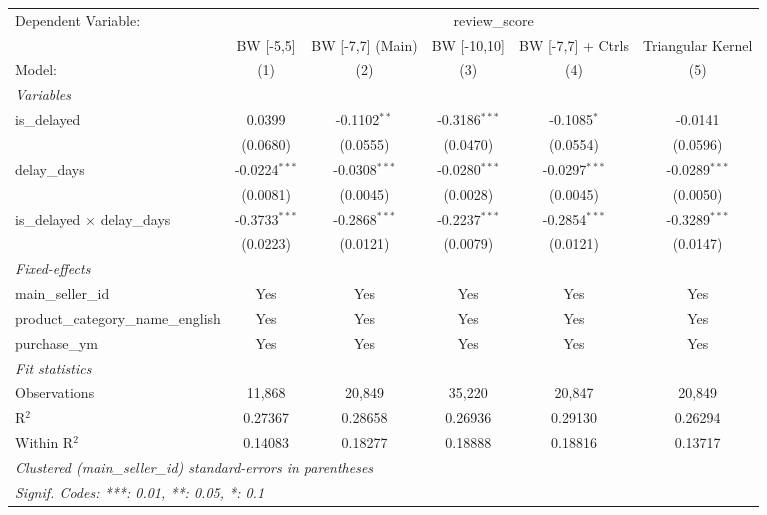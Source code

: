 
\begingroup
\centering
\begin{tabular}{lccccc}
   \tabularnewline \midrule \midrule
   Dependent Variable: & \multicolumn{5}{c}{review\_score}\\
                                       & BW [-5,5]       & BW [-7,7] (Main) & BW [-10,10]     & BW [-7,7] + Ctrls & Triangular Kernel \\   
   Model:                              & (1)             & (2)              & (3)             & (4)               & (5)\\  
   \midrule
   \emph{Variables}\\
   is\_delayed                         & 0.0399          & -0.1102$^{**}$   & -0.3186$^{***}$ & -0.1085$^{*}$     & -0.0141\\   
                                       & (0.0680)        & (0.0555)         & (0.0470)        & (0.0554)          & (0.0596)\\   
   delay\_days                         & -0.0224$^{***}$ & -0.0308$^{***}$  & -0.0280$^{***}$ & -0.0297$^{***}$   & -0.0289$^{***}$\\   
                                       & (0.0081)        & (0.0045)         & (0.0028)        & (0.0045)          & (0.0050)\\   
   is\_delayed $\times$ delay\_days    & -0.3733$^{***}$ & -0.2868$^{***}$  & -0.2237$^{***}$ & -0.2854$^{***}$   & -0.3289$^{***}$\\   
                                       & (0.0223)        & (0.0121)         & (0.0079)        & (0.0121)          & (0.0147)\\   
   \midrule
   \emph{Fixed-effects}\\
   main\_seller\_id                    & Yes             & Yes              & Yes             & Yes               & Yes\\  
   product\_category\_name\_english    & Yes             & Yes              & Yes             & Yes               & Yes\\  
   purchase\_ym                        & Yes             & Yes              & Yes             & Yes               & Yes\\  
   \midrule
   \emph{Fit statistics}\\
   Observations                        & 11,868          & 20,849           & 35,220          & 20,847            & 20,849\\  
   R$^2$                               & 0.27367         & 0.28658          & 0.26936         & 0.29130           & 0.26294\\  
   Within R$^2$                        & 0.14083         & 0.18277          & 0.18888         & 0.18816           & 0.13717\\  
   \midrule \midrule
   \multicolumn{6}{l}{\emph{Clustered (main\_seller\_id) standard-errors in parentheses}}\\
   \multicolumn{6}{l}{\emph{Signif. Codes: ***: 0.01, **: 0.05, *: 0.1}}\\
\end{tabular}
\par\endgroup


